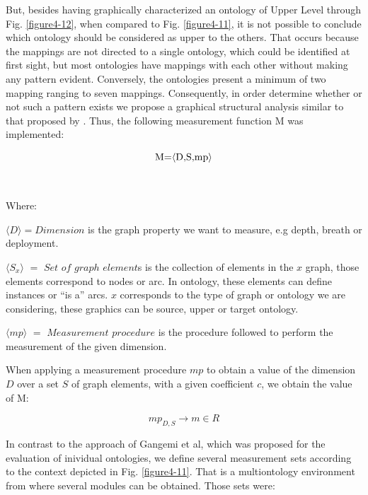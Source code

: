 But, besides having graphically characterized an ontology of Upper Level through Fig. \ref{figure4-12}, when compared to Fig. \ref{figure4-11}, it is not possible to conclude which ontology should be considered as upper to the others. That occurs because the mappings are not directed to a single ontology, which could be identified at first sight, but most ontologies have mappings with each other without making any pattern evident. Conversely, the ontologies present a minimum of two mapping ranging to seven mappings. Consequently, in order determine whether or not such a pattern exists we propose a graphical structural analysis similar to that proposed by \cite{gangemi_modelling_2006}.  Thus, the following measurement function M was implemented:

\begin{equation}
	$
	M=〈D,S,mp〉
	$
\end{equation}

\

Where:

$\langle D \rangle =Dimension$ is the graph property   we want  to measure, e.g depth, breath or deployment. 

$ \langle S_{x} \rangle $ $=$ $Set$ $ of $ $ graph$ $ element$s is the collection of elements  in the $x$ graph, those elements correspond to nodes or arc. In ontology, these elements can define instances or “is a” arcs.  $x$ corresponds to the type of graph   or ontology we are considering, these graphics can be source, upper or target ontology. 

$ \langle mp \rangle $ $=$ $Measurement$ $ procedure$ is the procedure followed to perform the measurement of the given dimension. 


When applying a measurement procedure $mp$ to obtain a value of the dimension $D$ over a set $S$ of graph elements, with a given coefficient $c$, we obtain  the  value of M:

\begin{equation}
	mp_{D,S}   \longrightarrow  m   \in R 
\end{equation}


In contrast to the approach of Gangemi et al, \cbstart which was proposed for the evaluation of inividual ontologies, we define several measurement sets according to the context depicted in Fig. \ref{figure4-11}. That is a multiontology environment from where several modules can be obtained. Those sets were:\cbend 


